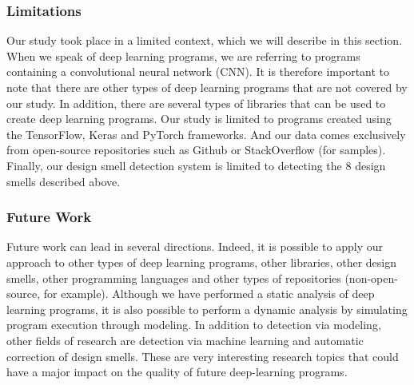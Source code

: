 \label{sec:limitationsFutureWork}

\subsubsection{Limitations}
\label{sec:limitations}
Our study took place in a limited context, which we will describe in this section. When we speak of deep learning programs, we are referring to programs containing a convolutional neural network (CNN). It is therefore important to note that there are other types of deep learning programs that are not covered by our study. In addition, there are several types of libraries that can be used to create deep learning programs. Our study is limited to programs created using the TensorFlow, Keras and PyTorch frameworks. And our data comes exclusively from open-source repositories such as Github or StackOverflow (for samples). Finally, our design smell detection system is limited to detecting the 8 design smells described above.\\

\subsubsection{Future Work}
\label{sec:futureWork}
Future work can lead in several directions. Indeed, it is possible to apply our
approach to other types of deep learning programs, other libraries, other design
smells, other programming languages and other types of repositories (non-open-source, for example). Although we have performed a static analysis of deep
learning programs, it is also possible to perform a dynamic analysis by
simulating program execution through modeling. In addition to detection via
modeling, other fields of research are detection via machine learning and
automatic correction of design smells. These are very interesting research
topics that could have a major impact on the quality of future deep-learning
programs.






